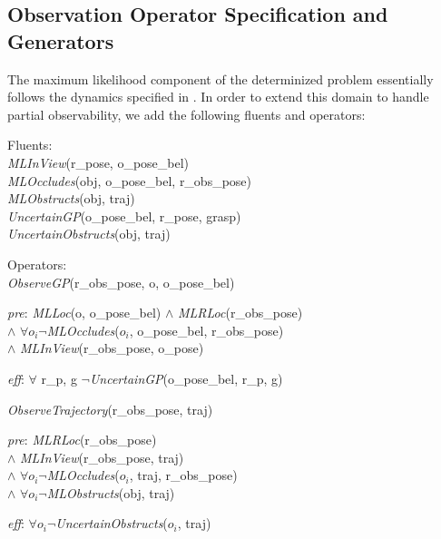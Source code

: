 \subsection{Observation Operator Specification and Generators}
The maximum likelihood component of the determinized problem
essentially follows the dynamics specified in
. In order to extend this domain to handle
partial observability, we add the following fluents and operators:
\begin{tightlist}
  \item[]Fluents: \\\emph{MLInView}(r\_pose, o\_pose\_bel)\\
    \emph{MLOccludes}(obj, o\_pose\_bel, r\_obs\_pose)\\
    \emph{MLObstructs}(obj, traj)\\
    \emph{UncertainGP}(o\_pose\_bel, r\_pose, grasp)\\
    \emph{UncertainObstructs}(obj, traj)
  \item[]Operators: \\\emph{ObserveGP}(r\_obs\_pose, o, o\_pose\_bel)
\begin{tightlist}
  \item[\emph{pre}:] \emph{MLLoc}(o, o\_pose\_bel) $\wedge$
    \emph{MLRLoc}(r\_obs\_pose) \\$\wedge$ $\forall o_i
    \lnot$\emph{MLOccludes}($o_i$, o\_pose\_bel, r\_obs\_pose) \\ $\wedge$
    \emph{MLInView}(r\_obs\_pose, o\_pose)
  \item[\emph{eff}:] $\forall$ r\_p, g $\lnot$\emph{UncertainGP}(o\_pose\_bel, r\_p, g)
\end{tightlist}
\emph{ObserveTrajectory}(r\_obs\_pose, traj) 

\begin{tightlist}
  \item[\emph{pre}:] \emph{MLRLoc}(r\_obs\_pose) \\$\wedge$
    \emph{MLInView}(r\_obs\_pose, traj)\\ $\wedge$
    $\forall o_i \lnot$\emph{MLOccludes}($o_i$, traj, r\_obs\_pose)\\ $\wedge$
    $\forall o_i \lnot$\emph{MLObstructs}(obj, traj)\\
  \item[\emph{eff}:] $\forall o_i \lnot$\emph{UncertainObstructs}($o_i$,
    traj)
\end{tightlist}
\end{tightlist}


